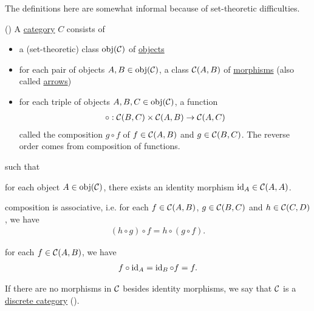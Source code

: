 \begin{note}
  The definitions here are somewhat informal because of set-theoretic difficulties.
\end{note}

\begin{definition}\label{def:category}(\cite[definition 1.1.1]{Leinster2014})
  A \uline{category} $C$ consists of
  \begin{itemize}
    \item a (set-theoretic) class $\operatorname{obj}(\mathcal C)$ of \uline{objects}
    \item for each pair of objects $A, B \in \operatorname{obj}(\mathcal C)$, a class ${\mathcal C}(A, B)$ of \uline{morphisms} (also called \uline{arrows})
    \item for each triple of objects $A, B, C \in \operatorname{obj}(\mathcal C)$, a function
    \begin{align*}
      \circ: {\mathcal C}(B, C) \times {\mathcal C}(A, B) \to {\mathcal C}(A, C)
    \end{align*}
    called the composition $g \circ f$ of $f \in {\mathcal C}(A, B)$ and $g \in {\mathcal C}(B, C)$. The reverse order comes from composition of functions.
  \end{itemize}
  such that
  \begin{defenum}
    \item for each object $A \in \operatorname{obj}(\mathcal C)$, there exists an identity morphism $\operatorname{id}_A \in {\mathcal C}(A, A)$.
    \item composition is associative, i.e. for each $f \in {\mathcal C}(A, B)$, $g \in {\mathcal C}(B, C)$ and $h \in {\mathcal C}(C, D)$, we have
    \begin{align*}
      (h \circ g) \circ f = h \circ (g \circ f).
    \end{align*}
    \item for each $f \in {\mathcal C}(A, B)$, we have
    \begin{align*}
      f \circ \operatorname{id}_A = \operatorname{id}_B \circ f = f.
    \end{align*}
  \end{defenum}

  If there are no morphisms in $\mathcal C$ besides identity morphisms, we say that $\mathcal C$ is a \uline{discrete category} (\cite[example 1.1.18(b)]{Leinster2014}).
\end{definition}

